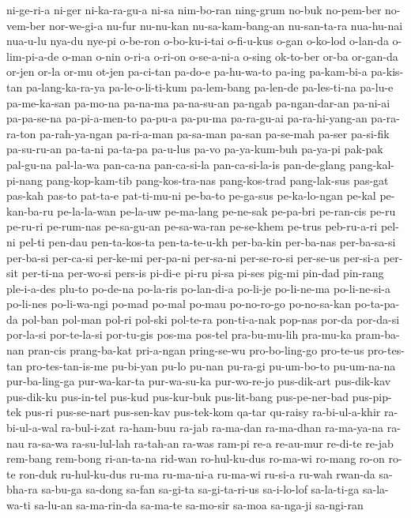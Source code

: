 {ni-ge-ri-a ni-ger ni-ka-ra-gu-a ni-sa nim-bo-ran ning-grum no-buk
no-pem-ber no-vem-ber nor-we-gi-a nu-fur nu-nu-kan nu-sa-kam-bang-an
nu-san-ta-ra nua-hu-nai nua-u-lu nya-du nye-pi o-be-ron o-bo-ku-i-tai
o-fi-u-kus o-gan o-ko-lod o-lan-da o-lim-pi-a-de o-man o-nin o-ri-a
o-ri-on o-se-a-ni-a o-sing ok-to-ber or-ba or-gan-da or-jen or-la or-mu
ot-jen pa-ci-tan pa-do-e pa-hu-wa-to pa-ing pa-kam-bi-a pa-kis-tan
pa-lang-ka-ra-ya pa-le-o-li-ti-kum pa-lem-bang pa-len-de pa-les-ti-na
pa-lu-e pa-me-ka-san pa-mo-na pa-na-ma pa-na-su-an pa-ngab pa-ngan-dar-an
pa-ni-ai pa-pa-se-na pa-pi-a-men-to pa-pu-a pa-pu-ma pa-ra-gu-ai
pa-ra-hi-yang-an pa-ra-ra-ton pa-rah-ya-ngan pa-ri-a-man pa-sa-man pa-san
pa-se-mah pa-ser pa-si-fik pa-su-ru-an pa-ta-ni pa-ta-pa pa-u-lus pa-vo
pa-ya-kum-buh pa-ya-pi pak-pak pal-gu-na pal-la-wa pan-ca-na pan-ca-si-la
pan-ca-si-la-is pan-de-glang pang-kal-pi-nang pang-kop-kam-tib
pang-kos-tra-nas pang-kos-trad pang-lak-sus pas-gat pas-kah pas-to
pat-ta-e pat-ti-mu-ni pe-ba-to pe-ga-sus pe-ka-lo-ngan pe-kal pe-kan-ba-ru
pe-la-la-wan pe-la-uw pe-ma-lang pe-ne-sak pe-pa-bri pe-ran-cis pe-ru
pe-ru-ri pe-rum-nas pe-sa-gu-an pe-sa-wa-ran pe-se-khem pe-trus
peb-ru-a-ri pel-ni pel-ti pen-dau pen-ta-kos-ta pen-ta-te-u-kh per-ba-kin
per-ba-nas per-ba-sa-si per-ba-si per-ca-si per-ke-mi per-pa-ni per-sa-ni
per-se-ro-si per-se-us per-si-a per-sit per-ti-na per-wo-si pers-is
pi-di-e pi-ru pi-sa pi-ses pig-mi pin-dad pin-rang ple-i-a-des plu-to
po-de-na po-la-ris po-lan-di-a po-li-je po-li-ne-ma po-li-ne-si-a
po-li-nes po-li-wa-ngi po-mad po-mal po-mau po-no-ro-go po-no-sa-kan
po-ta-pa-da pol-ban pol-man pol-ri pol-ski pol-te-ra pon-ti-a-nak pop-nas
por-da por-da-si por-la-si por-te-la-si por-tu-gis pos-ma pos-tel
pra-bu-mu-lih pra-mu-ka pram-ba-nan pran-cis prang-ba-kat pri-a-ngan
pring-se-wu pro-bo-ling-go pro-te-us pro-tes-tan pro-tes-tan-is-me
pu-bi-yan pu-lo pu-nan pu-ra-gi pu-um-bo-to pu-um-na-na pur-ba-ling-ga
pur-wa-kar-ta pur-wa-su-ka pur-wo-re-jo pus-dik-art pus-dik-kav pus-dik-ku
pus-in-tel pus-kud pus-kur-buk pus-lit-bang pus-pe-ner-bad pus-pip-tek
pus-ri pus-se-nart pus-sen-kav pus-tek-kom qa-tar qu-raisy ra-bi-ul-a-khir
ra-bi-ul-a-wal ra-bul-i-zat ra-ham-buu ra-jab ra-ma-dan ra-ma-dhan
ra-ma-ya-na ra-nau ra-sa-wa ra-su-lul-lah ra-tah-an ra-was ram-pi re-a
re-au-mur re-di-te re-jab rem-bang rem-bong ri-an-ta-na rid-wan
ro-hul-ku-dus ro-ma-wi ro-mang ro-on ro-te ron-duk ru-hul-ku-dus ru-ma
ru-ma-ni-a ru-ma-wi ru-si-a ru-wah rwan-da sa-bha-ra sa-bu-ga sa-dong
sa-fan sa-gi-ta sa-gi-ta-ri-us sa-i-lo-lof sa-la-ti-ga sa-la-wa-ti
sa-lu-an sa-ma-rin-da sa-ma-te sa-mo-sir sa-moa sa-nga-ji sa-ngi-ran
}
